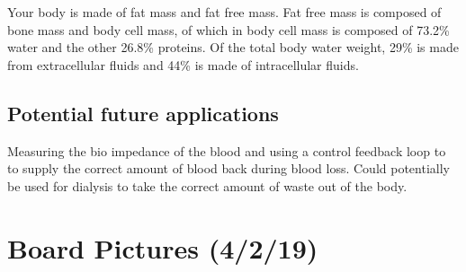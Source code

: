 \documentclass[11pt]{book}
\begin{document}
Your body is made of fat mass and fat free mass. Fat free mass is composed of bone mass and body cell mass, of which in body cell mass is composed of 73.2\% water and the other 26.8\% proteins. Of the total body water weight, 29\% is made from extracellular fluids and 44\% is made of intracellular fluids.

\subsection{Potential future applications} Measuring the bio impedance of the blood and using a control feedback loop to to supply the correct amount of blood back during blood loss. Could potentially be used for dialysis to take the correct amount of waste out of the body.

\section{Board Pictures (4/2/19)}
\end{document}
